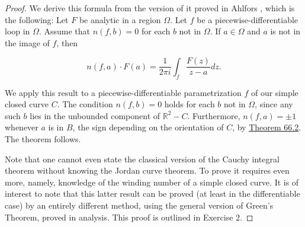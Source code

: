 \begin{proof}
We derive this formula from the version of it proved in Ahlfors \cite{Ahlfors1979}, which is the following:
Let \(F\) be analytic in a region \(\Omega\). Let \(f\) be a piecewise-differentiable loop in \(\Omega\). Assume that \(n( {f,b}) = 0\) for each \(b\) not in \(\Omega\). If \(a \in \Omega\) and \(a\) is not in the image of \(f\), then

\[
n( {f,a}) \cdot F( a) = \frac{1}{2\pi i}{\int }_{f}\frac{F( z) }{z - a}{dz}.
\]

We apply this result to a piecewise-differentiable parametrization \(f\) of our simple closed curve \(C\). The condition \(n( {f,b}) = 0\) holds for each \(b\) not in \(\Omega\), since any such \(b\) lies in the unbounded component of \(\mathbb{R}^{2} - C\). Furthermore, \(n( {f,a}) = \pm 1\) whenever \(a\) is in \(B\), the sign depending on the orientation of \(C\), by \hyperref[thm:66.2]{Theorem 66.2}. The theorem follows.

Note that one cannot even state the classical version of the Cauchy integral theorem without knowing the Jordan curve theorem. To prove it requires even more, namely, knowledge of the winding number of a simple closed curve. It is of interest to note that this latter result can be proved (at least in the differentiable case) by an entirely different method, using the general version of Green's Theorem, proved in analysis. This proof is outlined in Exercise 2.
\end{proof}
